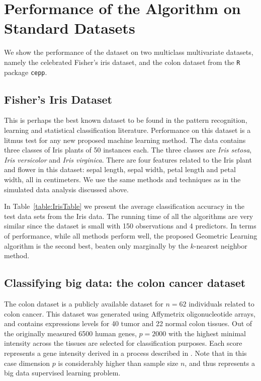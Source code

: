 \documentclass[twoside]{article}
\begin{document}
 


\section{Performance of the Algorithm on Standard Datasets}
\label{sec:RealData}


We show the performance of the dataset on two multiclass multivariate datasets, namely 
the celebrated
Fisher's iris dataset,  and the colon dataset from the {\tt R} package {\tt cepp}. 


\subsection{Fisher's Iris Dataset}

This is perhaps the best known dataset to be found in the 
pattern recognition, learning and statistical classification literature. 
Performance on this dataset is a litmus test for any new proposed 
machine learning method. The data contains three classes of Iris plants
 of 50 instances each. The three classes are {\it Iris setosa}, 
 {\it Iris versicolor} 
 and {\it Iris virginica}. There are four features related to the Iris plant  and flower 
 in this dataset: sepal length, sepal width, petal length and petal width, all 
 in centimeters. We use the same methods and techniques as in the simulated 
 data analysis discussed above. 
 
 
 

In Table~\ref{table:IrisTable} we present the average classification accuracy 
in the test data sets from the Iris data.  The running time of all the algorithms 
are very similar since the dataset is small with 150 observations and 4 predictors.
In terms of performance, while all methods perform well, the proposed Geometric Learning
algorithm is the second best, beaten only marginally by the $k$-nearest neighbor method. 


\subsection{Classifying big data: the colon cancer dataset}

The colon dataset is a publicly available dataset for $n = 62$ individuals related to 
colon cancer. This dataset was generated using Affymetrix oligonucleotide arrays, and  
contains expressions levels for 40 tumor and 22 normal colon tissues. Out of the 
originally measured 6500 human genes, $ p = 2000$ with the highest minimal intensity 
across the tissues are selected for classification purposes. Each score represents a gene 
intensity derived in a process described in \cite{Alon-etal-99}. Note that in this case 
dimension $p$ is considerably higher than sample size $n$, and thus represents a big 
data  supervised learning problem.
\end{document}
